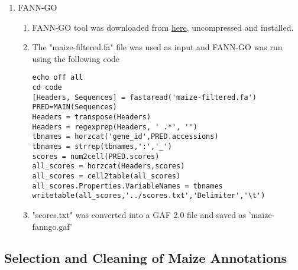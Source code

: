 \begin{enumerate}
\begin{enumerate}
\begin{lstlisting}[breaklines]
[EVALUATION] ### IF YOU DON'T KNOW WHAT YOU ARE DOING, DON'T CHANGE ANYTHING FROM THIS ON!!!!
PRINT_EVAL=False
TEST=False
OTHER=False
      \end{lstlisting}
      \item PANNZER was run for each config file
      \item All results files from each split fasta files were concatenated and converted to a GAF 2.0 file
      \item GAF file was saved as 'maize-pannzer.gaf'
    \end{enumerate}
    \item FANN-GO
    \begin{enumerate}
      \item FANN-GO tool was downloaded from \href{http://montana.informatics.indiana.edu/fanngo/fanngo.html}{here}, uncompressed and installed.
      \item The "maize-filtered.fa" file was used as input and FANN-GO was run using the following code
      \begin{verbatim}
echo off all
cd code
[Headers, Sequences] = fastaread('maize-filtered.fa')
PRED=MAIN(Sequences)
Headers = transpose(Headers)
Headers = regexprep(Headers, ' .*', '')
tbnames = horzcat('gene_id',PRED.accessions)
tbnames = strrep(tbnames,':','_')
scores = num2cell(PRED.scores)
all_scores = horzcat(Headers,scores)
all_scores = cell2table(all_scores)
all_scores.Properties.VariableNames = tbnames
writetable(all_scores,'../scores.txt','Delimiter','\t')
    \end{verbatim}
    \item "scores.txt" was converted into a GAF 2.0 file and saved as 'maize-fanngo.gaf'
    \end{enumerate}
  \end{enumerate}
  \subsection{Selection and Cleaning of Maize Annotations}
